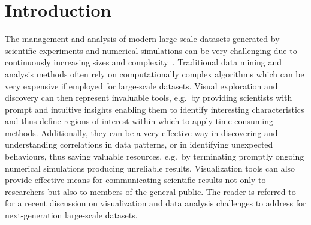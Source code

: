 \documentclass[preprint,5pt]{elsarticle}
\begin{document}
\section{Introduction}
\label{sec:intro}

The management and analysis of modern large-scale datasets generated by scientific experiments and numerical simulations can be very challenging due to continuously increasing sizes and complexity~\cite{DataTsunami}. Traditional data mining and analysis methods often rely on computationally complex
algorithms which can be very expensive if employed for 
large-scale datasets. Visual exploration and discovery can then represent invaluable tools, e.g.\ by providing scientists with prompt and intuitive insights enabling them to identify interesting characteristics and thus define regions of interest within which
to apply time-consuming methods. Additionally, they can be a very effective way in discovering and understanding correlations in data patterns, or in identifying unexpected behaviours, thus saving valuable resources, e.g.\ by terminating promptly ongoing numerical simulations producing unreliable results. Visualization tools can also provide effective means for communicating scientific results not only to researchers but also to members of the general public. The reader is referred to~\cite{DataAnalysisVisualization} for a recent discussion on visualization and data analysis challenges to address for next-generation large-scale datasets.
\end{document}
